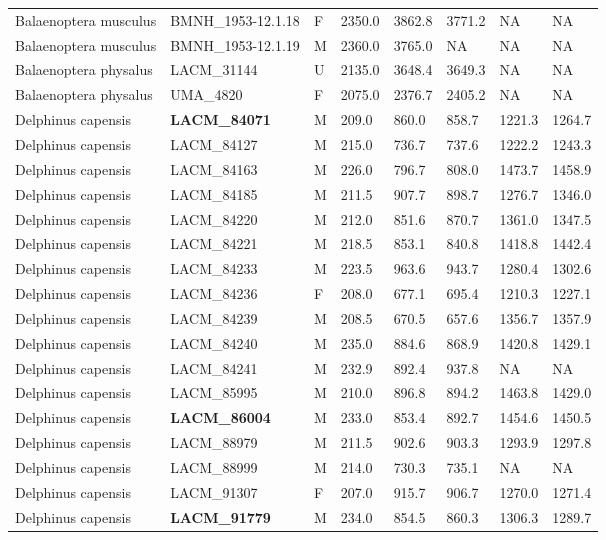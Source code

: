 \begin{longtable}{|p{1.95in}p{1.1in}p{.15in}p{.4in}p{.4in}p{.4in}p{.4in}p{.4in}|}
  Balaenoptera musculus & BMNH\_1953-12.1.18 & F & 2350.0 & 3862.8 & 3771.2 & NA & NA  \\ 
  Balaenoptera musculus & BMNH\_1953-12.1.19 & M & 2360.0 & 3765.0 & NA & NA & NA  \\ 
  Balaenoptera physalus & LACM\_31144 & U & 2135.0 & 3648.4 & 3649.3 & NA & NA  \\ 
  Balaenoptera physalus & UMA\_4820 & F & 2075.0 & 2376.7 & 2405.2 & NA & NA  \\ 
  Delphinus capensis & \textbf{ LACM\_84071 } & M & 209.0 & 860.0 & 858.7 & 1221.3 & 1264.7 \\ 
  Delphinus capensis & LACM\_84127 & M & 215.0 & 736.7 & 737.6 & 1222.2 & 1243.3 \\ 
  Delphinus capensis & LACM\_84163 & M & 226.0 & 796.7 & 808.0 & 1473.7 & 1458.9 \\ 
  Delphinus capensis & LACM\_84185 & M & 211.5 & 907.7 & 898.7 & 1276.7 & 1346.0 \\ 
  Delphinus capensis & LACM\_84220 & M & 212.0 & 851.6 & 870.7 & 1361.0 & 1347.5 \\ 
  Delphinus capensis & LACM\_84221 & M & 218.5 & 853.1 & 840.8 & 1418.8 & 1442.4 \\ 
  Delphinus capensis & LACM\_84233 & M & 223.5 & 963.6 & 943.7 & 1280.4 & 1302.6 \\ 
  Delphinus capensis & LACM\_84236 & F & 208.0 & 677.1 & 695.4 & 1210.3 & 1227.1 \\ 
  Delphinus capensis & LACM\_84239 & M & 208.5 & 670.5 & 657.6 & 1356.7 & 1357.9 \\ 
  Delphinus capensis & LACM\_84240 & M & 235.0 & 884.6 & 868.9 & 1420.8 & 1429.1 \\ 
  Delphinus capensis & LACM\_84241 & M & 232.9 & 892.4 & 937.8 & NA & NA  \\ 
  Delphinus capensis & LACM\_85995 & M & 210.0 & 896.8 & 894.2 & 1463.8 & 1429.0 \\ 
  Delphinus capensis & \textbf{ LACM\_86004 } & M & 233.0 & 853.4 & 892.7 & 1454.6 & 1450.5 \\ 
  Delphinus capensis & LACM\_88979 & M & 211.5 & 902.6 & 903.3 & 1293.9 & 1297.8 \\ 
  Delphinus capensis & LACM\_88999 & M & 214.0 & 730.3 & 735.1 & NA & NA  \\ 
  Delphinus capensis & LACM\_91307 & F & 207.0 & 915.7 & 906.7 & 1270.0 & 1271.4 \\ 
  Delphinus capensis & \textbf{ LACM\_91779 } & M & 234.0 & 854.5 & 860.3 & 1306.3 & 1289.7 \\ 

\end{longtable}
